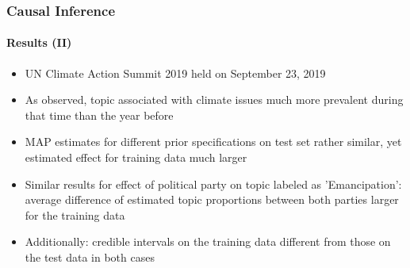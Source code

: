 \documentclass[xcolor=dvipsnames]{beamer}
\begin{document}
\begin{frame}
\frametitle{Causal Inference}
\framesubtitle{Results (II)}
\begin{itemize}
\item UN Climate Action Summit 2019 held on September 23, 2019
\item As observed, topic associated with climate issues much more prevalent during that time than the year before
\item MAP estimates for different prior specifications on test set rather similar, yet estimated effect for training data much larger
\item Similar results for effect of political party on topic labeled as 'Emancipation': average difference of estimated topic proportions between both parties larger for the training data
\item Additionally: credible intervals on the training data different from those on the test data in both cases
\end{itemize}
\end{frame}
\end{document}
